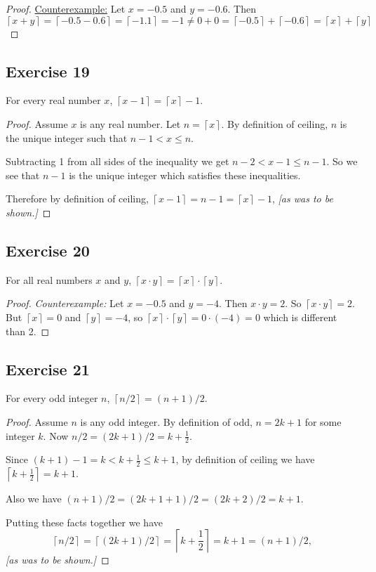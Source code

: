 \documentclass[14pt]{extarticle}
\newcommand{\ceil}[1]{{\left\lceil#1\right\rceil}}
\begin{document}
\begin{proof}
    \underline{Counterexample:} Let $x = -0.5$ and $y = -0.6$. Then
    \[
        \ceil{x+y} = \ceil{-0.5-0.6} = \ceil{-1.1} = -1 \neq 0+0 = \ceil{-0.5} + \ceil{-0.6} = \ceil{x} + \ceil{y}
    \]
\end{proof}

\subsection{Exercise 19}
For every real number $x$, $\ceil{x - 1} = \ceil{x} - 1$.

\begin{proof}
    Assume $x$ is any real number. Let $n = \ceil{x}$. By definition of ceiling, $n$ is the unique integer such that $n-1 < x \leq n$.

    Subtracting 1 from all sides of the inequality we get $n-2 < x-1 \leq n-1$. So we see that $n-1$ is the unique integer which satisfies these inequalities.

    Therefore by definition of ceiling, $\ceil{x-1} = n-1 = \ceil{x}-1$, {\it [as was to be shown.]}
\end{proof}

\subsection{Exercise 20}
For all real numbers $x$ and $y$, $\ceil{x \cdot y} = \ceil{x} \cdot \ceil{y}$.

\begin{proof}
    {\it Counterexample:} Let $x = -0.5$ and $y = -4$. Then $x\cdot y = 2$. So $\ceil{x\cdot y} = 2$. But $\ceil{x} = 0$ and $\ceil{y} = -4$, so $\ceil{x} \cdot \ceil{y} = 0\cdot(-4) = 0$ which is different than 2.
\end{proof}

\subsection{Exercise 21}
For every odd integer $n$, $\ceil{n/2} = (n + 1) / 2$.

\begin{proof}
    Assume $n$ is any odd integer. By definition of odd, $n = 2k+1$ for some integer $k$. Now $n/2 = (2k+1)/2 = k+\frac{1}{2}$.

    Since $(k+1)-1 = k < k+\frac{1}{2} \leq k+1$, by definition of ceiling we have $\ceil{k+\frac{1}{2}} = k+1$.

    Also we have $(n+1)/2 = (2k+1+1)/2 = (2k+2)/2 = k+1$.

    Putting these facts together we have
    \[
        \ceil{n/2} = \ceil{(2k+1)/2} = \ceil{k+\frac{1}{2}} = k+1 = (n+1)/2,
    \]
    {\it[as was to be shown.]}
\end{proof}
\end{document}
